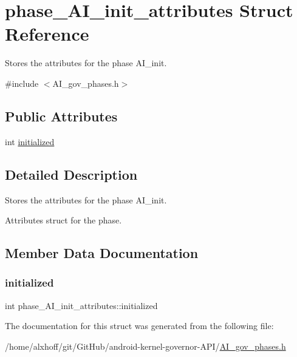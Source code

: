 \hypertarget{structphase__AI__init__attributes}{}\section{phase\+\_\+\+A\+I\+\_\+init\+\_\+attributes Struct Reference}
\label{structphase__AI__init__attributes}


Stores the attributes for the phase A\+I\+\_\+init.  




{\ttfamily \#include $<$A\+I\+\_\+gov\+\_\+phases.\+h$>$}

\subsection*{Public Attributes}
\begin{DoxyCompactItemize}
\item 
int \hyperlink{structphase__AI__init__attributes_ac3c8c0bd3f71afeedc3ed470cb1284f2}{initialized}
\end{DoxyCompactItemize}


\subsection{Detailed Description}
Stores the attributes for the phase A\+I\+\_\+init. 

Attributes struct for the phase. 

\subsection{Member Data Documentation}
\mbox{\label{structphase__AI__init__attributes_ac3c8c0bd3f71afeedc3ed470cb1284f2}} 
\subsubsection{\texorpdfstring{initialized}{initialized}}
{\footnotesize\ttfamily int phase\+\_\+\+A\+I\+\_\+init\+\_\+attributes\+::initialized}



The documentation for this struct was generated from the following file\+:\begin{DoxyCompactItemize}
\item 
/home/alxhoff/git/\+Git\+Hub/android-\/kernel-\/governor-\/\+A\+P\+I/\hyperlink{AI__gov__phases_8h}{A\+I\+\_\+gov\+\_\+phases.\+h}\end{DoxyCompactItemize}
